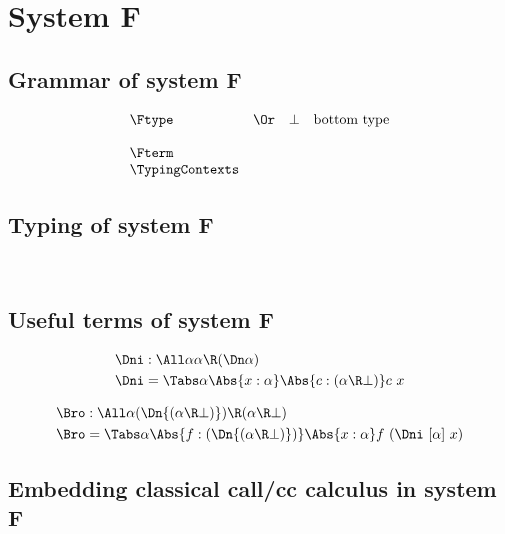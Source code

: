 \documentclass{amsart}
\begin{document}
\FRules

\ExistentialIntroduction

\ExistentialElimination

\DoubleNegationElimination

\section{System F}

\subsection{Grammar of system F}

\[
\begin{array}{lclr}
\Ftype
&\Or& \bot & \mbox{bottom type} \\
\\
\Fterm
\\
\TypingContexts
\end{array}
\]

\subsection{Typing of system F}
~

\FRules

\subsection{Useful terms of system F}

\begin{align*}
\Dni & : \All\alpha \alpha \R (\Dn\alpha) \\
\Dni & = \Tabs\alpha \Abs{x:\alpha}
           \Abs{c : (\alpha \R \bot)} c~x
\end{align*}

\begin{align*}
\Bro & : \All\alpha (\Dn{(\alpha\R\bot)}) \R (\alpha \R \bot) \\
\Bro & = \Tabs\alpha \Abs{f:(\Dn{(\alpha\R\bot)})}
           \Abs{x:\alpha} f~(\Dni~[\alpha]~x)
\end{align*}

\subsection{Embedding classical call/cc calculus in system F}
\end{document}
